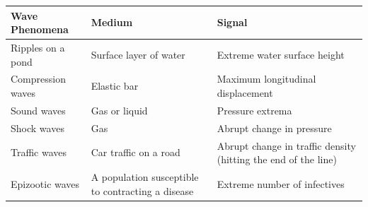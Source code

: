 \documentclass[12pt, letterpaper]{article}
\begin{document}
    \begin{tabularx}{\textwidth}{|l | X | X|}
        \hline
        \textbf{Wave Phenomena} & \textbf{Medium} & \textbf{Signal}\\
        \hline
        Ripples on a pond & Surface layer of water & Extreme water surface height \\
        Compression waves & Elastic bar & Maximum longitudinal displacement\\
        Sound waves & Gas or liquid & Pressure extrema \\
        Shock waves & Gas & Abrupt change in pressure \\
        Traffic waves & Car traffic on a road & Abrupt change in traffic density (hitting the end of the line) \\
        Epizootic waves & A population susceptible to contracting a disease & Extreme number of infectives \\
        \hline
    \end{tabularx}
\end{document}

